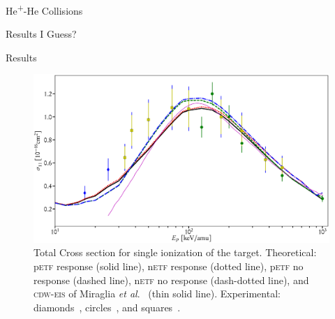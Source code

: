 \documentclass[letterpaper, 11 pt]{report}
\begin{document}
\begin{chapter}{\texorpdfstring{He\textsuperscript{+}}{He+}-He Collisions \label{chap:hephe}}
\begin{section}{Results I Guess? \label{sec:hephe-disc}}
\begin{subsection}{Results \label{sec:hephe-res}}
         \begin{figure}[t]
            \centering
            \includegraphics[width = \linewidth]{./images/hephe-cross/HepHe-111.eps}
            \caption[Total Cross section for single ionization of the target in He\textsuperscript{+}-He
                     collisions.]
                    {Total Cross section for single ionization of the target.
                     Theoretical: p\textsc{etf} response (solid line), n\textsc{etf} response
                                  (dotted line),
                                  p\textsc{etf} no response (dashed line), n\textsc{etf} no response
                                  (dash-dotted line), and
                                  \textsc{cdw-eis} of Miraglia \textit{et al}.~\cite{MG-10} (thin solid
                                  line).
                     Experimental: diamonds~\cite{Dub-89}, circles~\cite{FTFHLP-95}, and
                                   squares~\cite{DT-88}.
                     \label{fig:cs111}}
         \end{figure}
 

\end{subsection}
\end{section}
\end{chapter}
\end{document}
